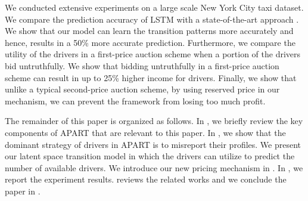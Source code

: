 We conducted extensive experiments on a large scale New York City taxi dataset. We compare the prediction accuracy of LSTM with a state-of-the-art approach \cite{Zhang14}. We show that our model can learn the transition patterns more accurately and hence, results in a 50\% more accurate prediction. Furthermore, we compare the utility of the drivers in a first-price auction scheme when a portion of the drivers bid untruthfully. We show that bidding untruthfully in a first-price auction scheme can result in up to 25\% higher income for drivers. Finally, we show that unlike a typical second-price auction scheme, by using reserved price in our mechanism, we can prevent the framework from losing too much profit.

The remainder of this paper is organized as follows. In , we briefly review the key components of APART that are relevant to this paper. In , we show that the dominant strategy of drivers in APART is to misreport their profiles. We present our latent space transition model in  which the drivers can utilize to predict the number of available drivers. We introduce our new pricing mechanism in . In , we report the experiment results.  reviews the related works and we conclude the paper in .